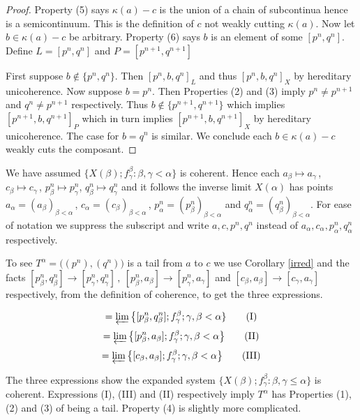 \documentclass[12pt]{article}
\theoremstyle{plain}
\theoremstyle{definition}
\newcommand{\A}{\ensuremath{\alpha}}
\newcommand{\K}{\ensuremath{\kappa}}
\newcommand{\B}{\ensuremath{\beta}}
\newcommand{\G}{\ensuremath{\gamma}}
\newcommand{\0}{\ensuremath{\varnothing}}
\begin{document}
	\begin{proof}
		Property (5) says $\K(a) - c$ is the union of a chain of subcontinua hence is a semicontinuum.
		This is the definition of $c$ not weakly cutting $\K(a)$.
		Now let $b \in \K(a) - c$ be arbitrary.
		Property (6) says $b$ is an element of some $[p^n,q^n]$.
		Define $L = [p^n,q^n]$ and $P = [p^{n+1},q^{n+1}]$
		
		First suppose $b \notin \{ p^{n}, q^{n} \}$.
		Then $[p^n,b,q^n]_L$ and thus $[p^n,b,q^n]_X$ by hereditary unicoherence.
		Now suppose  $b = p^n$.
		Then Properties (2) and (3) imply $p^n \ne p^{n+1}$ and $q^{n} \ne p^{n+1}$ respectively.
		Thus $b \notin \{ p^{n+1}, q^{n+1} \} $ which implies $ [p^{n+1},b,q^{n+1}]_P$ which in turn implies  $ [p^{n+1},b,q^{n+1}]_X$ by hereditary unicoherence.
		The case for $b = q^n$ is similar.
		We conclude each $b \in \K(a)-c$ weakly cuts the composant.
	\end{proof}
	
	We have assumed \mbox{$\{X(\B); f^\B_\G : \B,\G< \A\}$} is coherent. Hence each $a_\B \mapsto a_\G \,$, $c_\B \mapsto c_\G \,$, $p^n_\B \mapsto p^n_\G$, $q^n_\B \mapsto q^n_\G$ and it follows the inverse limit $X(\A)$ has points $a_\A = (a_\B)_{\B<\A} \, $, $c_\A = (c_\B)_{\B<\A} \,$, $p^n_\A = (p^n_\B)_{\B<\A}$ and $q^n_\A = (q^n_\B)_{\B<\A}$. 
	For ease of notation we suppress the subscript and write $a,c,p^n,q^n$ instead of $a_\A,c_\A,p^n_\A,q^n_\A$ respectively.
	
	To see $T^\A = \big ((p^n), (q^n) \big)$ is a tail from $a$ to $c$ we use Corollary \ref{irred} and the facts
	$[p_\B^n, q_\B^n] \to [p_\G^n, q_\G^n] \, , \ [p_\B^n, a_\B] \to [p_\G^n, a_\G]$ 
	and $[c_\B, a_\B] \to [c_\G, a_\G]$ respectively, from the definition of coherence, to get the three expressions.
	
	
	\begin{equation}
	[p^n,q^n] =  \varprojlim \big \{[p_\B^n, q_\B^n]; f^\B_\G; \G,\B <\A \} \tag{I}
	\end{equation}
	\begin{equation}
	[p^n,a] =  \varprojlim \big\{[p_\B^n, a_\B]; f^\B_\G; \G,\B <\A \big \} \tag{II}
	\end{equation}
	\begin{equation}
	[c,a] =  \varprojlim \big\{[c_\B, a_\B]; f^\B_\G; \G,\B <\A \big \} \tag{III}
	\end{equation} \vspace{0mm}
	
	The three expressions show the expanded system \mbox{$\{X(\B); f^\B_\G : \B,\G \le \A\}$} is coherent. Expressions (I), (III) and (II) respectively imply $T^\A$ has  Properties (1), (2) and (3) of being a tail.
	Property (4) is slightly more complicated.
	
\end{document}
